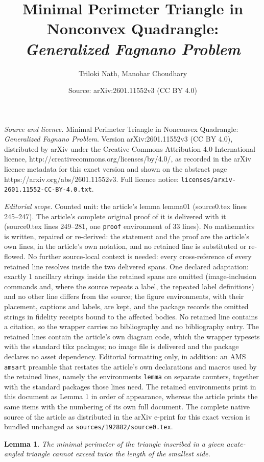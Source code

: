 \documentclass[10pt,a4paper]{amsart}
\title{Minimal Perimeter Triangle in Nonconvex Quadrangle: \\ \textit{Generalized Fagnano Problem}}
\author{Triloki Nath, Manohar Choudhary}
\date{Source: arXiv:2601.11552v3 (CC BY 4.0)}
\newtheorem{lemma}{Lemma}
\begin{document}
\maketitle

\noindent\emph{Source and licence.} Minimal Perimeter Triangle in Nonconvex Quadrangle: \\ \textit{Generalized Fagnano Problem}. Version arXiv:2601.11552v3 (CC BY 4.0), distributed by arXiv under the Creative Commons Attribution 4.0 International licence, http://creativecommons.org/licenses/by/4.0/, as recorded in the arXiv licence metadata for this exact version and shown on the abstract page https://arxiv.org/abs/2601.11552v3. Full licence notice: \texttt{licenses/arxiv-2601.11552-CC-BY-4.0.txt}.\par\smallskip

\noindent\textit{Editorial scope.} Counted unit: the article's lemma lemma01 (source0.tex lines 245--247). The article's complete original proof of it is delivered with it (source0.tex lines 249--281, one \texttt{proof} environment of 33 lines). No mathematics is written, repaired or re-derived: the statement and the proof are the article's own lines, in the article's own notation, and no retained line is substituted or re-flowed.  No further source-local context is needed: every cross-reference of every retained line resolves inside the two delivered spans.  One declared adaptation: exactly 1 ancillary strings inside the retained spans are omitted (image-inclusion commands and, where the source repeats a label, the repeated label definitions) and no other line differs from the source; the figure environments, with their placement, captions and labels, are kept, and the package records the omitted strings in fidelity receipts bound to the affected bodies.  No retained line contains a citation, so the wrapper carries no bibliography and no bibliography entry.  The retained lines contain the article's own diagram code, which the wrapper typesets with the standard tikz packages; no image file is delivered and the package declares no asset dependency.  Editorial formatting only, in addition: an AMS \texttt{amsart} preamble that restates the article's own declarations and macros used by the retained lines, namely the environments \texttt{lemma} on separate counters, together with the standard packages those lines need.  The retained environments print in this document as Lemma 1 in order of appearance, whereas the article prints the same items with the numbering of its own full document.  The complete native source of the article as distributed in the arXiv e-print for this exact version is bundled unchanged as \texttt{sources/192882/source0.tex}.
\begin{lemma} \label{lemma01}
	The minimal perimeter of the triangle inscribed in a given acute-angled triangle cannot exceed twice the length of the smallest side.
\end{lemma}
\end{document}
